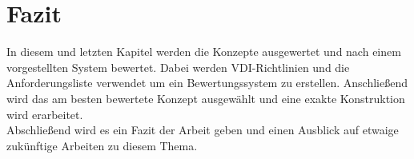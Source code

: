 \chapter{Fazit}\label{ch:conclusion}
In diesem und letzten Kapitel werden die Konzepte ausgewertet und nach einem vorgestellten System bewertet. Dabei werden VDI-Richtlinien und die Anforderungsliste verwendet um ein Bewertungssystem zu erstellen. Anschlie{\ss}end wird das am besten bewertete Konzept ausgew\"{a}hlt und eine exakte Konstruktion wird erarbeitet.\\
Abschlie{\ss}end wird es ein Fazit der Arbeit geben und einen Ausblick auf etwaige zuk\"{u}nftige Arbeiten zu diesem Thema.






